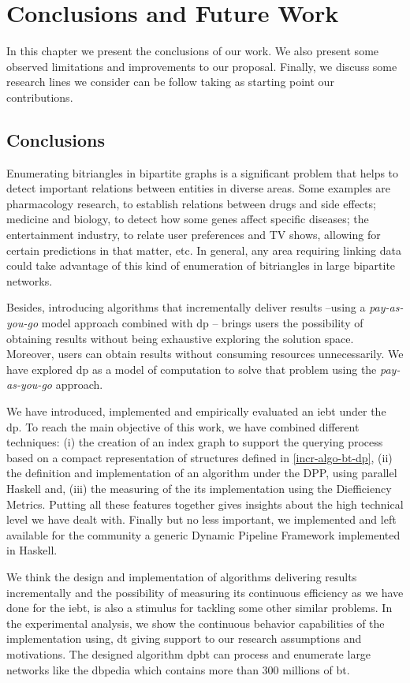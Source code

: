 \chapter{Conclusions and Future Work}\label{conclusions}
In this chapter we present the conclusions of our work.  We also present some observed limitations and  improvements to our proposal. Finally, we discuss  some  research lines we consider can be follow taking as starting  point our contributions.


\section{Conclusions}
Enumerating bitriangles in bipartite graphs is a significant problem that helps to detect important relations between entities in  diverse areas. Some examples are pharmacology research, to establish relations between drugs and side effects; medicine and biology, to detect how some genes affect specific diseases; the entertainment industry, to relate  user preferences and TV shows, allowing for certain predictions in that matter, etc.  In general, any area requiring linking data could take advantage of this kind of enumeration of  bitriangles in large bipartite networks. 

Besides, introducing algorithms that incrementally deliver results --using a \emph{pay-as-you-go} model approach combined with \acrshort{dp} -- brings users  the possibility of obtaining results  without being exhaustive exploring the solution space. Moreover, users can obtain results without consuming resources unnecessarily.
We have explored \acrlong{dp} as a model of computation to solve that problem using the \emph{pay-as-you-go} approach. 

We have introduced, implemented  and empirically evaluated an \acrlong{iebt} under the \acrlong{dp}. To reach the main objective of this work, we have combined different techniques: (i) the creation of an index graph to support the querying process based on a compact representation of structures defined in \autoref{incr-algo-bt-dp}, (ii) the definition and implementation of an algorithm under the DPP, using parallel Haskell and, (iii) the measuring of the its implementation using the Diefficiency Metrics. Putting all these features together gives insights about the high technical level we have dealt with. Finally but no less important, we implemented and left available for the community a generic Dynamic Pipeline Framework implemented in Haskell.

We think the design and implementation of algorithms delivering results incrementally and the possibility of measuring its continuous efficiency as we have done for the \acrshort{iebt}, is also a  stimulus for tackling some other similar problems. In the experimental analysis, we show the continuous behavior capabilities of the implementation using, \acrlong{dt} giving support to our research assumptions and motivations. The designed algorithm \acrshort{dpbt} can process and enumerate large networks like the \acrlong{dbpedia} which contains more than $300$ millions of \acrlong{bt}. 

